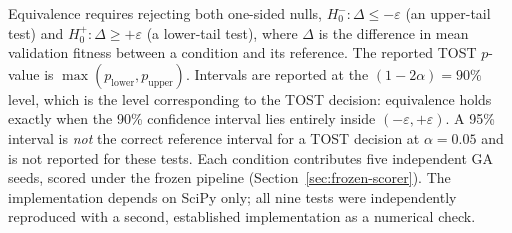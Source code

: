 \documentclass[mathematics,article,submit,xetex,moreauthors]{Definitions/mdpi}
\begin{document}
Equivalence requires rejecting both one-sided nulls,
$H_0^{-}\colon \Delta \le -\varepsilon$ (an upper-tail test) and
$H_0^{+}\colon \Delta \ge +\varepsilon$ (a lower-tail test), where $\Delta$
is the difference in mean validation fitness between a condition and its
reference. The reported TOST $p$-value is
$\max(p_{\mathrm{lower}}, p_{\mathrm{upper}})$. Intervals are reported at the
$(1-2\alpha) = 90\%$ level, which is the level corresponding to the TOST
decision: equivalence holds exactly when the 90\% confidence interval lies
entirely inside $(-\varepsilon, +\varepsilon)$. A 95\% interval is
\emph{not} the correct reference interval for a TOST decision at
$\alpha=0.05$ and is not reported for these tests. Each condition
contributes five independent GA seeds, scored under the frozen pipeline
(Section~\ref{sec:frozen-scorer}). The implementation depends on SciPy only;
all nine tests were independently reproduced with a second, established
implementation as a numerical check.
\end{document}
